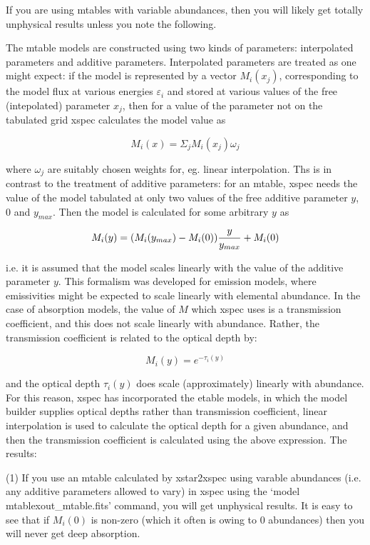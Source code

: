 If you are using mtables with variable abundances, then you will likely get 
totally unphysical results unless you note the following.  

The mtable models are constructed using two kinds of parameters:  interpolated 
parameters and additive parameters.  Interpolated parameters are treated 
as one might expect:  if the model is represented by a vector $M_i(x_j)$, 
corresponding to the model flux at various energies $\varepsilon_i$ and 
stored at various values of the free (intepolated) parameter $x_j$, 
then for a value of the parameter not on the tabulated grid xspec 
calculates the model value as

$$M_i(x)=\Sigma_j M_i(x_j)\omega_j$$

\noindent where $\omega_j$ are suitably chosen weights for, eg. linear 
interpolation.  Ths is in contrast to the treatment of additive parameters:
for an mtable, xspec needs the value of the model tabulated at only 
two values of the free additive parameter $y$, 0 and $y_{max}$.  Then the 
model is calculated for some arbitrary $y$ as

$$M_i(y)=(M_i(y_{max})-M_i(0)){{y}\over{y_{max}}}+M_i(0)$$

\noindent i.e. it is assumed that the model scales linearly with the value 
of the additive parameter $y$.  This formalism was developed for 
emission models, where emissivities might be expected to scale 
linearly with elemental abundance.  In the case of absorption models, 
the value of $M$ which xspec uses is a transmission coefficient, and this 
does not scale linearly with abundance.  Rather, the transmission coefficient 
is related to the optical depth by:

$$M_i(y)=e^{-\tau_i(y)}$$

\noindent and the optical depth $\tau_i(y)$ does scale (approximately) linearly
with abundance.  For this reason, xspec has incorporated the etable models, 
in which the model builder supplies optical depths rather than transmission 
coefficient, linear interpolation is used to calculate the optical depth 
for a given abundance, and then the transmission coefficient is 
calculated using the above expression.  The results:

(1) If you use an mtable calculated by xstar2xspec using varable abundances
(i.e. any additive parameters allowed to vary) in xspec using 
the `model mtable{xout\_mtable.fits}' command, you will get unphysical 
results.  It is easy to see that if $M_i(0)$ is non-zero (which it often 
is owing to 0 abundances) then you will never get deep absorption.

